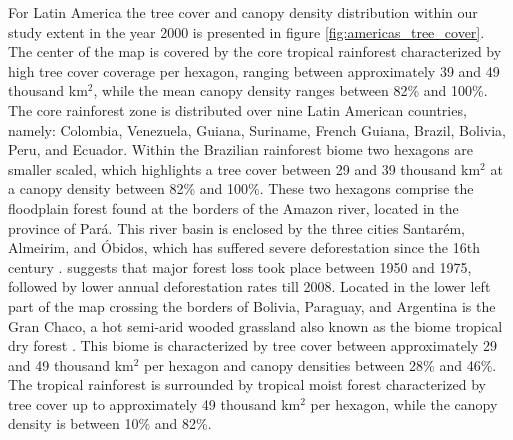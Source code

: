 			For Latin America the tree cover and canopy density distribution within our study extent in the year 2000 is presented in figure \ref{fig:americas_tree_cover}. The center of the map is covered by the core tropical rainforest characterized by high tree cover coverage per hexagon, ranging between approximately 39 and 49 thousand km$^2$, while the mean canopy density ranges between 82\% and 100\%. The core rainforest zone is distributed over nine Latin American countries, namely: Colombia, Venezuela, Guiana, Suriname, French Guiana, Brazil, Bolivia, Peru, and Ecuador. Within the Brazilian rainforest biome two hexagons are smaller scaled, which highlights a tree cover between 29 and 39 thousand km$^2$ at a canopy density between 82\% and 100\%. These two hexagons comprise the floodplain forest found at the borders of the Amazon river, located in the province of Pará. This river basin is enclosed by the three cities Santarém, Almeirim, and Óbidos, which has suffered severe deforestation since the 16th century \citep{Reno2011}. \citet{Reno2011} suggests that major forest loss took place between 1950 and 1975, followed by lower annual deforestation rates till 2008. Located in the lower left part of the map crossing the borders of Bolivia, Paraguay, and Argentina is the Gran Chaco, a hot semi-arid wooded grassland also known as the biome tropical dry forest \citep{Caldas2013}. This biome is characterized by tree cover between approximately 29 and 49 thousand km$^2$ per hexagon and canopy densities between 28\% and 46\%. The tropical rainforest is surrounded by tropical moist forest characterized by tree cover up to approximately 49 thousand km$^2$ per hexagon, while the canopy density is between 10\% and 82\%.
